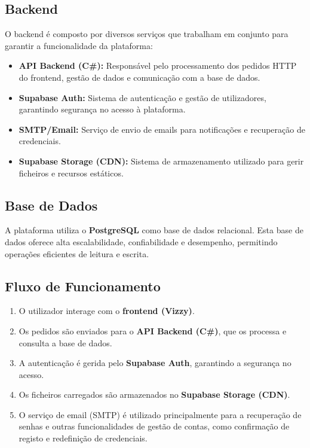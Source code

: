\documentclass[a4paper, 12pt]{article} %
\begin{document}
\subsection{Backend}
O backend é composto por diversos serviços que trabalham em conjunto para garantir a funcionalidade da plataforma:

\begin{itemize}
	\item \textbf{API Backend (C\#):} Responsável pelo processamento dos pedidos HTTP do frontend, gestão de dados e comunicação com a base de dados.
	\item \textbf{Supabase Auth:} Sistema de autenticação e gestão de utilizadores, garantindo segurança no acesso à plataforma.
	\item \textbf{SMTP/Email:} Serviço de envio de emails para notificações e recuperação de credenciais.
	\item \textbf{Supabase Storage (CDN):} Sistema de armazenamento utilizado para gerir ficheiros e recursos estáticos.
\end{itemize}

\subsection{Base de Dados}
A plataforma utiliza o \textbf{PostgreSQL} como base de dados relacional. Esta base de dados oferece alta escalabilidade, confiabilidade e desempenho, permitindo operações eficientes de leitura e escrita.

\subsection{Fluxo de Funcionamento}
\begin{enumerate}
	\item O utilizador interage com o \textbf{frontend (Vizzy)}.
	\item Os pedidos são enviados para o \textbf{API Backend (C\#)}, que os processa e consulta a base de dados.
	\item A autenticação é gerida pelo \textbf{Supabase Auth}, garantindo a segurança no acesso.
	\item Os ficheiros carregados são armazenados no \textbf{Supabase Storage (CDN)}.
	\item O serviço de email (SMTP) é utilizado principalmente para a recuperação de senhas e outras funcionalidades de gestão de contas, como confirmação de registo e redefinição de credenciais.
\end{enumerate}
\end{document}
